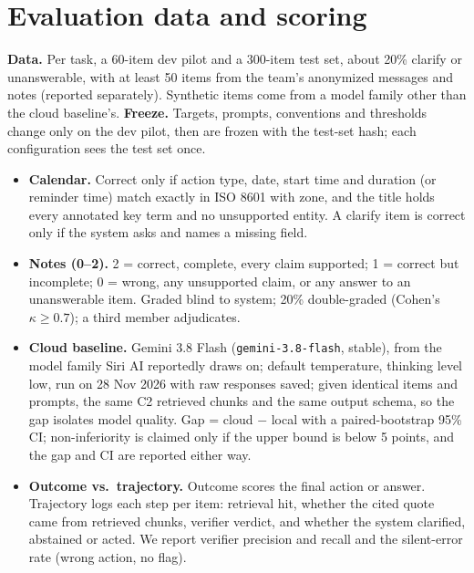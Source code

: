 \documentclass[10pt,letterpaper]{article}
\begin{document}
\section{Evaluation data and scoring}
\textbf{Data.} Per task, a 60-item dev pilot and a 300-item test set, about 20\% clarify or unanswerable, with at least 50 items from the team's anonymized messages and notes (reported separately). Synthetic items come from a model family other than the cloud baseline's.
\textbf{Freeze.} Targets, prompts, conventions and thresholds change only on the dev pilot, then are frozen with the test-set hash; each configuration sees the test set once.
\begin{itemize}
  \item \textbf{Calendar.} Correct only if action type, date, start time and duration (or reminder time) match exactly in ISO 8601 with zone, and the title holds every annotated key term and no unsupported entity. A clarify item is correct only if the system asks and names a missing field.
  \item \textbf{Notes (0--2).} 2 = correct, complete, every claim supported; 1 = correct but incomplete; 0 = wrong, any unsupported claim, or any answer to an unanswerable item. Graded blind to system; 20\% double-graded (Cohen's $\kappa \geq 0.7$); a third member adjudicates.
  \item \textbf{Cloud baseline.} Gemini 3.8 Flash (\texttt{gemini-3.8-flash}, stable), from the model family Siri AI reportedly draws on; default temperature, thinking level low, run on 28 Nov 2026 with raw responses saved; given identical items and prompts, the same C2 retrieved chunks and the same output schema, so the gap isolates model quality. Gap = cloud $-$ local with a paired-bootstrap 95\% CI; non-inferiority is claimed only if the upper bound is below 5 points, and the gap and CI are reported either way.
  \item \textbf{Outcome vs.\ trajectory.} Outcome scores the final action or answer. Trajectory logs each step per item: retrieval hit, whether the cited quote came from retrieved chunks, verifier verdict, and whether the system clarified, abstained or acted. We report verifier precision and recall and the silent-error rate (wrong action, no flag).
\end{itemize}
\end{document}
